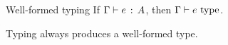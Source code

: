 %
%
%
%
%
%
%

\begin{lemma}{Well-formed typing} \label{wf-typing}
If $\Gamma \vdash e \ \!:\! \ A$, then $\Gamma \vdash e \ \text{type}$.
\end{lemma}
Typing always produces a well-formed type.


